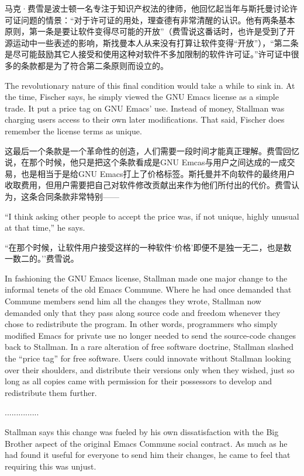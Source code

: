 \ifdefined\chs
马克·费雪是波士顿一名专注于知识产权法的律师，他回忆起当年与斯托曼讨论许可证问题的情景：``对于许可证的用处，理查德有非常清醒的认识。他有两条基本原则，第一条是要让软件变得尽可能的开放''（费雪说这番话时，也许是受到了开源运动中一些表述的影响，斯找曼本人从来没有打算让软件变得``开放''），``第二条是尽可能鼓励其它人接受和使用这种对软件不多加限制的软件许可证。''许可证中很多的条款都是为了符合第二条原则而设立的。
\fi

\ifdefined\eng
The revolutionary nature of this final condition would take a while to sink in. At the time, Fischer says, he simply viewed the GNU Emacs license as a simple trade. It put a price tag on GNU Emacs' use. Instead of money, Stallman was charging users access to their own later modifications. That said, Fischer does remember the license terms as unique.
\fi

\ifdefined\chs
这最后一个条款是一个革命性的创造，人们需要一段时间才能真正理解。费雪回忆说，在那个时候，他只是把这个条款看成是GNU Emcas与用户之间达成的一成交易，也是相当于是给GNU Emacs打上了价格标签。斯托曼并不向软件的最终用户收取费用，但用户需要把自己对软件修改贡献出来作为他们所付出的代价。费雪认为，这条合同条款非常特别——
\fi

\ifdefined\eng
``I think asking other people to accept the price was, if not unique, highly unusual at that time,'' he says.
\fi

\ifdefined\chs
``在那个时候，让软件用户接受这样的一种软件`价格'即便不是独一无二，也是数一数二的。''费雪说。
\fi

\ifdefined\eng
In fashioning the GNU Emacs license, Stallman made one major change to the informal tenets of the old Emacs Commune. Where he had once demanded that Commune members send him all the changes they wrote, Stallman now demanded only that they pass along source code and freedom whenever they chose to redistribute the program. In other words, programmers who simply modified Emacs for private use no longer needed to send the source-code changes back to Stallman. In a rare alteration of free software doctrine, Stallman slashed the ``price tag'' for free software. Users could innovate without Stallman looking over their shoulders, and distribute their versions only when they wished, just so long as all copies came with permission for their possessors to develop and redistribute them further.
\fi

\ifdefined\chs
...............
\fi

\ifdefined\eng
Stallman says this change was fueled by his own dissatisfaction with the Big Brother aspect of the original Emacs Commune social contract. As much as he had found it useful for everyone to send him their changes, he came to feel that requiring this was unjust.
\fi

